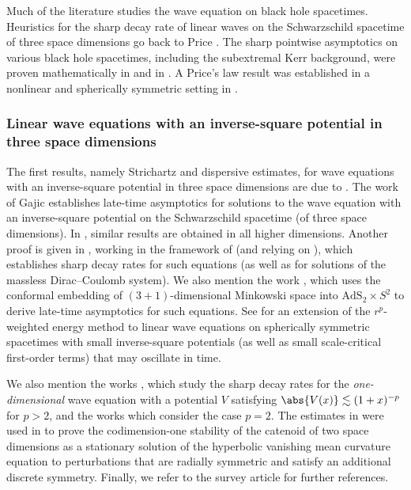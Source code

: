 \documentclass[10pt, reqno]{amsart}
\begin{document}
Much of the literature studies the wave equation on black hole spacetimes.
Heuristics for the sharp decay rate of linear waves on the Schwarzschild spacetime of
three space dimensions go back to Price \cite{PhysRevD.5.2439}. The sharp
pointwise asymptotics on various black hole spacetimes, including the
subextremal Kerr background, were proven mathematically in
\cite{MR3725885,ANGELOPOULOS2023108939,Angelopoulos_2023} and in
\cite{MR4365146}. A Price's law result was established in a nonlinear and
spherically symmetric setting in \cite{gautam2024latetimetailsmassinflation}.
\subsubsection{Linear wave equations with an inverse-square potential in three space dimensions}
\label{inverse-square-potential} The first results, namely Strichartz and dispersive
estimates, for wave equations with an inverse-square potential in three space
dimensions are due to \cite{Tahvildar-Zadeh2002-pk,BURQ2003519,Burq20041665}.
The work of Gajic \cite{GAJIC2023110058} establishes late-time asymptotics for
solutions to the wave equation with an inverse-square potential on the
Schwarzschild spacetime (of three space dimensions). In
\cite{hintz2023linearwavesasymptoticallyflat}, similar results are obtained in
all higher dimensions. Another proof is given in \cite{Baskin_2025}, working in
the framework of \cite{baskin-wunsch-vasy-2015} (and relying on
\cite{BASKIN2022108589}), which establishes sharp decay rates for such equations
(as well as for solutions of the massless Dirac--Coulomb system). We also
mention the work \cite{gajic2024latetimetailsscaleinvariantwave}, which uses the
conformal embedding of \((3 + 1)\)-dimensional Minkowski space into
\(\mathrm{AdS}_2\times S^2\) to derive late-time asymptotics for such equations.
See \cite{Moortel2025-sg} for an extension of the \(r^p\)-weighted energy method
to linear wave equations on spherically symmetric spacetimes with small
inverse-square potentials (as well as small scale-critical first-order terms)
that may oscillate in time.

We also mention the works \cite{Donninger_2010,Costin2014-za}, which study the
sharp decay rates for the \emph{one-dimensional} wave equation with a potential \(V\)
satisfying \(\abs{V(x)}\lesssim (1+x)^{-p}\) for \(p > 2\), and the works
\cite{COSTIN20082321,rk-fourier-wave} which consider the case \(p = 2\). The
estimates in \cite{rk-fourier-wave} were used in \cite{Donninger_2016} to prove
the codimension-one stability of the catenoid of two space dimensions as a
stationary solution of the hyperbolic vanishing mean curvature equation to
perturbations that are radially symmetric and satisfy an additional discrete
symmetry. Finally, we refer to the survey article \cite{Schlag_2021} for further
references.
\end{document}
